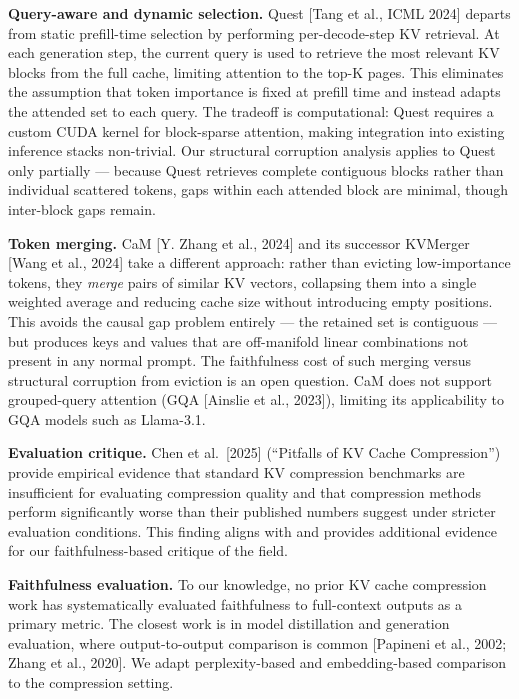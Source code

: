\documentclass[10pt,letterpaper]{article}
\begin{document}
\textbf{Query-aware and dynamic selection.} Quest {[}Tang et al., ICML
2024{]} departs from static prefill-time selection by performing
per-decode-step KV retrieval. At each generation step, the current query
is used to retrieve the most relevant KV blocks from the full cache,
limiting attention to the top-K pages. This eliminates the assumption
that token importance is fixed at prefill time and instead adapts the
attended set to each query. The tradeoff is computational: Quest
requires a custom CUDA kernel for block-sparse attention, making
integration into existing inference stacks non-trivial. Our structural
corruption analysis applies to Quest only partially --- because Quest
retrieves complete contiguous blocks rather than individual scattered
tokens, gaps within each attended block are minimal, though inter-block
gaps remain.

\textbf{Token merging.} CaM {[}Y. Zhang et al., 2024{]} and its
successor KVMerger {[}Wang et al., 2024{]} take a different approach:
rather than evicting low-importance tokens, they \emph{merge} pairs of
similar KV vectors, collapsing them into a single weighted average and
reducing cache size without introducing empty positions. This avoids the
causal gap problem entirely --- the retained set is contiguous --- but
produces keys and values that are off-manifold linear combinations not
present in any normal prompt. The faithfulness cost of such merging
versus structural corruption from eviction is an open question. CaM does
not support grouped-query attention (GQA {[}Ainslie et al., 2023{]}), limiting its applicability to
GQA models such as Llama-3.1.

\textbf{Evaluation critique.} Chen et al.~{[}2025{]} (``Pitfalls of KV
Cache Compression'') provide empirical evidence that standard KV
compression benchmarks are insufficient for evaluating compression
quality and that compression methods perform significantly worse than
their published numbers suggest under stricter evaluation conditions.
This finding aligns with and provides additional evidence for our
faithfulness-based critique of the field.

\textbf{Faithfulness evaluation.} To our knowledge, no prior KV cache
compression work has systematically evaluated faithfulness to
full-context outputs as a primary metric. The closest work is in model
distillation and generation evaluation, where output-to-output
comparison is common {[}Papineni et al., 2002; Zhang et al., 2020{]}. We
adapt perplexity-based and embedding-based comparison to the compression
setting.
\end{document}
